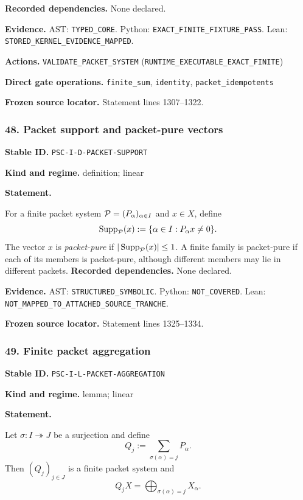 \documentclass[a4paper,11pt]{article}
\newcommand{\field}[2]{\noindent\textbf{#1.} #2\par}
\begin{document}
\field{Recorded dependencies}{None declared.}
\field{Evidence}{AST: \nolinkurl{TYPED_CORE}. Python: \nolinkurl{EXACT_FINITE_FIXTURE_PASS}. Lean: \nolinkurl{STORED_KERNEL_EVIDENCE_MAPPED}.}
\field{Actions}{\nolinkurl{VALIDATE_PACKET_SYSTEM} (\nolinkurl{RUNTIME_EXECUTABLE_EXACT_FINITE})}
\field{Direct gate operations}{\nolinkurl{finite_sum}, \nolinkurl{identity}, \nolinkurl{packet_idempotents}}
\field{Frozen source locator}{Statement lines 1307--1322.}
\subsubsection*{48. Packet support and packet-pure vectors}
\label{rec:PSC-I-D-PACKET-SUPPORT}
\field{Stable ID}{\nolinkurl{PSC-I-D-PACKET-SUPPORT}}
\field{Kind and regime}{definition; linear}
\textbf{Statement.}\par
For a finite packet system \(\mathcal P=(P_\alpha)_{\alpha\in I}\) and \(x\in X\), define
\[
\operatorname{Supp}_{\mathcal P}(x)
:=
\{\alpha\in I:P_\alpha x\neq0\}.
\]
The vector \(x\) is \emph{packet-pure} if \(|\operatorname{Supp}_{\mathcal P}(x)|\leq1\).  A finite family is packet-pure if each of its members is packet-pure, although different members may lie in different packets.
\field{Recorded dependencies}{None declared.}
\field{Evidence}{AST: \nolinkurl{STRUCTURED_SYMBOLIC}. Python: \nolinkurl{NOT_COVERED}. Lean: \nolinkurl{NOT_MAPPED_TO_ATTACHED_SOURCE_TRANCHE}.}
\field{Frozen source locator}{Statement lines 1325--1334.}
\subsubsection*{49. Finite packet aggregation}
\label{rec:PSC-I-L-PACKET-AGGREGATION}
\field{Stable ID}{\nolinkurl{PSC-I-L-PACKET-AGGREGATION}}
\field{Kind and regime}{lemma; linear}
\textbf{Statement.}\par
Let $\sigma:I\twoheadrightarrow J$ be a surjection and define
\[
Q_j:=\sum_{\sigma(\alpha)=j}P_\alpha.
\]
Then $(Q_j)_{j\in J}$ is a finite packet system and
\[
Q_jX=\bigoplus_{\sigma(\alpha)=j}X_\alpha.
\]
\end{document}
